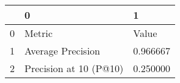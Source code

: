 \begin{tabular}{lll}
\toprule
 & 0 & 1 \\
\midrule
0 & Metric & Value \\
1 & Average Precision & 0.966667 \\
2 & Precision at 10 (P@10) & 0.250000 \\
\bottomrule
\end{tabular}
